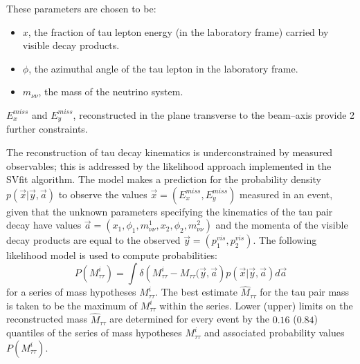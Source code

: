 These parameters are chosen to be:
\begin{itemize}
\item $x$, the fraction of tau lepton energy (in the laboratory frame) carried by visible decay products.
\item $\phi$, the azimuthal angle of the tau lepton in the laboratory frame.
\item $m_{\nu\nu}$, the mass of the neutrino system.
\end{itemize}
$E_{x}^{miss}$ and $E_{y}^{miss}$, reconstructed in the plane transverse to the beam--axis
provide 2 further constraints.


The reconstruction of tau decay kinematics is underconstrained by measured observables;
this is addressed by the likelihood approach implemented in the SVfit algorithm.
The model makes a prediction for the probability density $p(\vec{x} \vert \vec{y}, \vec{a})$
to observe the values $\vec{x} = (E_{x}^{miss}, E_{y}^{miss})$ measured in an event,
given that the unknown parameters specifying the kinematics of the tau pair decay have values
$\vec{a} = (x_{1}, \phi_{1}, m_{\nu\nu}^{1}, x_{2}, \phi_{2}, m_{\nu\nu}^{2})$
and the momenta of the visible decay products are equal to the observed $\vec{y} = (p^{vis}_{1}, p^{vis}_{2})$.
The following likelihood model is used to compute probabilities:
\begin{equation}
P(M_{\tau\tau}^{i}) = \int \delta \left( M_{\tau\tau}^{i} - M_{\tau\tau}(\vec{y}, \vec{a} \right) p(\vec{x} \vert \vec{y}, \vec{a}) d\vec{a}
\end{equation}
for a series of mass hypotheses $M_{\tau\tau}^{i}$.
The best estimate $\hat{M}_{\tau\tau}$ for the tau pair mass is taken to be the maximum of $M_{\tau\tau}^{i}$ within the series.
Lower (upper) limits on the reconstructed mass $\hat{M}_{\tau\tau}$ are determined for every event
by the $0.16$ ($0.84$) quantiles of the series of mass hypotheses $M_{\tau\tau}^{i}$
and associated probability values $P(M_{\tau\tau}^{i})$.

